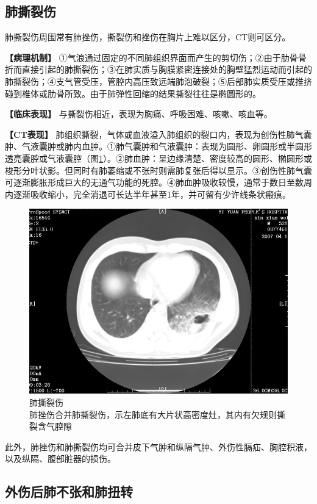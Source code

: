 \subsection{肺撕裂伤}

肺撕裂伤周围常有肺挫伤，撕裂伤和挫伤在胸片上难以区分，CT则可区分。

\textbf{【病理机制】}
①气浪通过固定的不同肺组织界面而产生的剪切伤；②由于肋骨骨折而直接引起的肺撕裂伤；③在肺实质与胸膜紧密连接处的胸壁猛烈运动而引起的肺撕裂伤；④支气管受压，管腔内高压致远端肺泡破裂；⑤后部肺实质受压或推挤碰到椎体或肋骨所致。由于肺弹性回缩的结果撕裂往往是椭圆形的。

\textbf{【临床表现】} 与撕裂伤相近，表现为胸痛、呼吸困难、咳嗽、咳血等。

\textbf{【CT表现】}
肺组织撕裂，气体或血液溢入肺组织的裂口内，表现为创伤性肺气囊肿、气液囊肿或肺内血肿。①肺气囊肿和气液囊肿：表现为圆形、卵圆形或半圆形透亮囊腔或气液囊腔（图\ref{fig9-34}）。②肺血肿：呈边缘清楚、密度较高的圆形、椭圆形或梭形分叶状影。但同时有肺萎缩或不张时则需肺复张后得以显示。③创伤性肺气囊可逐渐膨胀形成巨大的无通气功能的死腔。④肺血肿吸收较慢，通常于数日至数周内逐渐吸收缩小，完全消退可长达半年甚至1年，并可留有少许线条状瘢痕。

\begin{figure}[!htbp]
 \centering
 \includegraphics[width=.7\textwidth,height=\textheight,keepaspectratio]{./images/Image00225.jpg}
 \captionsetup{justification=centering}
 \caption{肺撕裂伤\\{\small 肺挫伤合并肺撕裂伤，示左肺底有大片状高密度灶，其内有欠规则撕裂含气腔隙}}
 \label{fig9-34}
  \end{figure} 

此外，肺挫伤和肺撕裂伤均可合并皮下气肿和纵隔气肿、外伤性膈疝、胸腔积液，以及纵隔、腹部脏器的损伤。

\subsection{外伤后肺不张和肺扭转}

